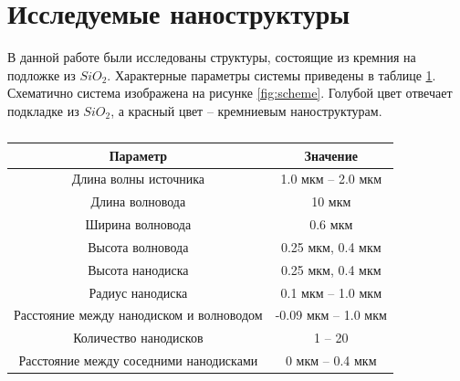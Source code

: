 \section{Исследуемые наноструктуры}

В данной работе были исследованы структуры, состоящие из кремния на подложке из $SiO_2$. Характерные параметры системы приведены в таблице \ref{tbl:params}. Схематично система изображена на рисунке \ref{fig:scheme}. Голубой цвет отвечает подкладке из $SiO_2$, а красный цвет -- кремниевым наноструктурам.

\begin{table}[H]
	\centering
	\begin{tabular}{|c|c|}
		\hline
		Параметр & Значение\\
		\hline
		\hline
		Длина волны источника & 1.0 мкм -- 2.0 мкм \\
		\hline
		Длина волновода & 10 мкм \\
		\hline
		Ширина волновода & 0.6 мкм \\
		\hline
		Высота волновода & 0.25 мкм, 0.4 мкм \\
		\hline
		Высота нанодиска & 0.25 мкм, 0.4 мкм \\
		\hline
		Радиус нанодиска & 0.1 мкм -- 1.0 мкм\\
		\hline
		Расстояние между нанодиском и волноводом & -0.09 мкм -- 1.0 мкм\\
		\hline
		Количество нанодисков & 1 -- 20 \\
		\hline
		Расстояние между соседними нанодисками & 0 мкм -- 0.4 мкм \\
		\hline
	\end{tabular}
	\caption{}
	\label{tbl:params}
\end{table}

